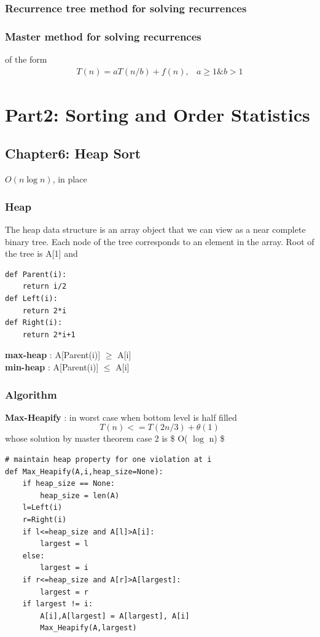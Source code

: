 \documentclass[11pt]{article}
\begin{document}
\subsubsection{Recurrence tree method for solving recurrences}
\label{sec:orge7e9b86}

\subsubsection{Master method for solving recurrences}
\label{sec:orgdfcff68}
of the form
\begin{align*}
T(n) = aT(n/b) + f(n), & a\geq1 \& b>1
\end{align*}

\section{Part2: Sorting and Order Statistics}
\label{sec:orgbbd09bd}

\subsection{Chapter6: Heap Sort}
\label{sec:orgc07c923}
\(O (n \log n)\), in place

\subsubsection{Heap}
\label{sec:orgb640a25}
The heap data structure is an array object that we can view as a near complete binary tree.
Each node of the tree corresponds to an element in the array. Root of the tree is A[1] and
\begin{verbatim}
def Parent(i):
    return i/2
def Left(i):
    return 2*i
def Right(i):
    return 2*i+1
\end{verbatim}
\textbf{max-heap} : A[Parent(i)] \(\ge\) A[i] \\
\textbf{min-heap} : A[Parent(i)] \(\le\) A[i]
\subsubsection{Algorithm}
\label{sec:org94f0912}
\textbf{Max-Heapify} : in worst case when bottom level is half filled
\begin{equation}
T(n) <= T(2n/3) + \theta (1)
\end{equation}
whose solution by master theorem case 2 is \$ O( \(\log\) n) \$
\begin{verbatim}
# maintain heap property for one violation at i
def Max_Heapify(A,i,heap_size=None):
    if heap_size == None:
        heap_size = len(A)
    l=Left(i)
    r=Right(i)
    if l<=heap_size and A[l]>A[i]:
        largest = l
    else:
        largest = i
    if r<=heap_size and A[r]>A[largest]:
        largest = r
    if largest != i:
        A[i],A[largest] = A[largest], A[i]
        Max_Heapify(A,largest)
\end{verbatim}
\end{document}
